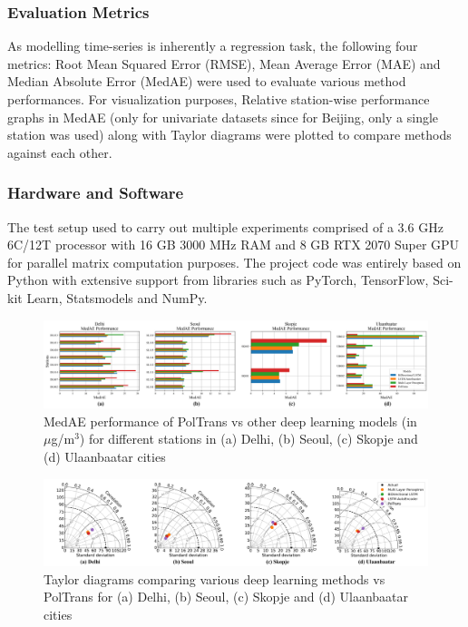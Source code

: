\documentclass[twocolumn]{svjour3}          %
\begin{document}
\subsubsection{Evaluation Metrics}
As modelling time-series is inherently a regression task, the following four metrics: Root Mean Squared Error (RMSE), Mean Average Error (MAE) and Median Absolute Error (MedAE) were used to evaluate various method performances. For visualization purposes, Relative station-wise performance graphs in MedAE (only for univariate datasets since for Beijing, only a single station was used) along with Taylor diagrams were plotted to compare methods against each other.

\subsubsection{Hardware and Software}
The test setup used to carry out multiple experiments comprised of a 3.6 GHz 6C/12T processor with 16 GB 3000 MHz RAM and 8 GB RTX 2070 Super GPU for parallel matrix computation purposes. The project code was entirely based on Python with extensive support from libraries such as PyTorch, TensorFlow, Sci-kit Learn, Statsmodels and NumPy.

\begin{figure}[h]
\centering
\includegraphics[scale=0.365]{./dl_medae.png}
\caption{MedAE performance of {PolTrans} vs other deep learning models (in $\mu$g/m$^{3}$) for different stations in (a) Delhi, (b) Seoul, (c) Skopje and (d) Ulaanbaatar cities}
\label{fig:dl-medae}
\end{figure}

\begin{figure}[h]
\centering
\includegraphics[width=18cm]{./merged_taylor_dl.png}
\caption{Taylor diagrams comparing various deep learning methods vs {PolTrans} for (a) Delhi, (b) Seoul, (c) Skopje and (d) Ulaanbaatar cities}
\label{fig:dl-taylor}
\end{figure}
\end{document}
